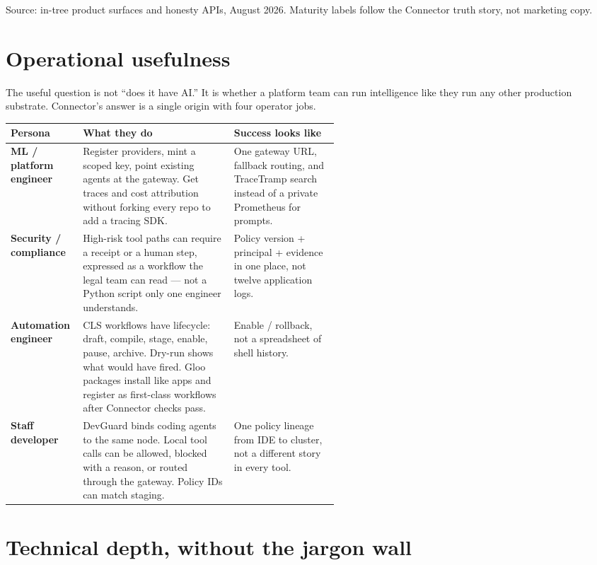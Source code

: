 \documentclass[10pt]{article}
\newcommand{\muted}[1]{\textcolor{textmuted}{#1}}
\begin{document}
\vspace{0.12em}
{\footnotesize\muted{Source: in-tree product surfaces and honesty APIs, August 2026. Maturity labels follow the Connector truth story, not marketing copy.}}

\section{Operational usefulness}

The useful question is not ``does it have AI.'' It is whether a platform team can run intelligence like they run any other production substrate. Connector's answer is a single origin with four operator jobs.

\renewcommand{\arraystretch}{1.14}
{\small
\begin{tabularx}{\linewidth}{@{}>{\bfseries\arraybackslash}p{0.22\linewidth} X >{\raggedright\arraybackslash}p{0.32\linewidth}@{}}
\toprule
Persona & What they do & Success looks like \\
\midrule
ML / platform engineer & Register providers, mint a scoped key, point existing agents at the gateway. Get traces and cost attribution without forking every repo to add a tracing SDK. & One gateway URL, fallback routing, and TraceTramp search instead of a private Prometheus for prompts. \\
Security / compliance & High-risk tool paths can require a receipt or a human step, expressed as a workflow the legal team can read --- not a Python script only one engineer understands. & Policy version + principal + evidence in one place, not twelve application logs. \\
Automation engineer & CLS workflows have lifecycle: draft, compile, stage, enable, pause, archive. Dry-run shows what would have fired. Gloo packages install like apps and register as first-class workflows after Connector checks pass. & Enable / rollback, not a spreadsheet of shell history. \\
Staff developer & DevGuard binds coding agents to the same node. Local tool calls can be allowed, blocked with a reason, or routed through the gateway. Policy IDs can match staging. & One policy lineage from IDE to cluster, not a different story in every tool. \\
\bottomrule
\end{tabularx}}

\section{Technical depth, without the jargon wall}
\end{document}
